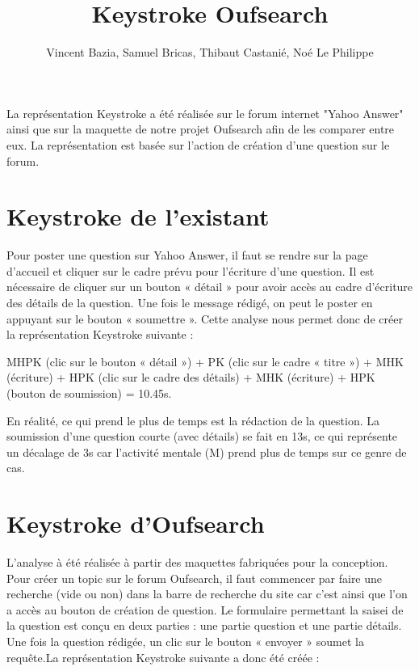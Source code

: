 \documentclass[a4paper,11pt]{report}
\begin{document}
\title{\textbf{Keystroke Oufsearch}}
\author{Vincent Bazia, Samuel Bricas, Thibaut Castanié, Noé Le Philippe}
\date{}
\pagestyle{empty}
\maketitle

La représentation Keystroke a été réalisée sur le forum internet "Yahoo Answer" ainsi que sur la maquette de notre projet Oufsearch afin de les comparer entre eux. La représentation est basée sur l'action de création d’une question sur le forum.


\section*{Keystroke de l’existant}
Pour poster une question sur Yahoo Answer, il faut se rendre sur la page d’accueil et cliquer sur le cadre prévu pour l’écriture d’une question. Il est nécessaire de cliquer sur un bouton « détail » pour avoir accès au cadre d’écriture des détails de la question. Une fois le message rédigé, on peut le poster en appuyant sur le bouton « soumettre ». Cette analyse nous permet donc de créer la représentation Keystroke suivante :

\begin{adjustwidth}{2cm}{}
MHPK (clic sur le bouton « détail ») \newline+ PK (clic sur le cadre « titre ») + MHK (écriture) \newline+ HPK (clic sur le cadre des détails) \newline+ MHK (écriture) \newline+ HPK (bouton de soumission) \newline= 10.45s.
\end{adjustwidth}

En réalité, ce qui prend le plus de temps est la rédaction de la question. La soumission d’une question courte (avec détails) se fait en 13s, ce qui représente un décalage de 3s car l’activité mentale (M) prend plus de temps sur ce genre de cas.

\section*{Keystroke d’Oufsearch}

L’analyse à été réalisée à partir des maquettes fabriquées pour la conception. Pour créer un topic sur le forum Oufsearch, il faut commencer par faire une recherche (vide ou non) dans la barre de recherche du site car c’est ainsi que l’on a accès au bouton de création de question. Le formulaire permettant la saisei de la question est conçu en deux parties : une partie question et une partie détails. Une fois la question rédigée, un clic sur le bouton « envoyer » soumet la requête.\newline La représentation Keystroke suivante a donc été créée :
\end{document}
